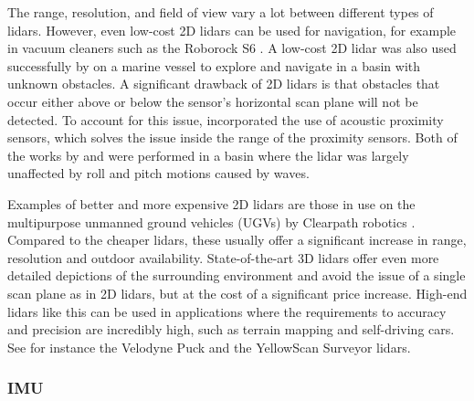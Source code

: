 The range, resolution, and field of view vary a lot between different types of lidars. However, even low-cost 2D lidars can be used for navigation, for example in vacuum cleaners such as the Roborock S6 \citep{website:roborock}. A low-cost 2D lidar was also used successfully by \citet{Ueland2016} on a marine vessel to explore and navigate in a basin with unknown obstacles. A significant drawback of 2D lidars is that obstacles that occur either above or below the sensor's horizontal scan plane will not be detected. To account for this issue, \citet{Spange2016} incorporated the use of acoustic proximity sensors, which solves the issue inside the range of the proximity sensors. Both of the works by \citet{Spange2016} and \citet{Ueland2016} were performed in a basin where the lidar was largely unaffected by roll and pitch motions caused by waves.

Examples of better and more expensive 2D lidars are those in use on the multipurpose unmanned ground vehicles (UGVs) by Clearpath robotics \citep{website:Clearpath}. Compared to the cheaper lidars, these usually offer a significant increase in range, resolution and outdoor availability. State-of-the-art 3D lidars offer even more detailed depictions of the surrounding environment and avoid the issue of a single scan plane as in 2D lidars, but at the cost of a significant price increase. High-end lidars like this can be used in applications where the requirements to accuracy and precision are incredibly high, such as terrain mapping and self-driving cars. See for instance the Velodyne Puck \citep{website:VLP} and the YellowScan Surveyor \citep{website:YellowScan} lidars.


\subsubsection{IMU}

